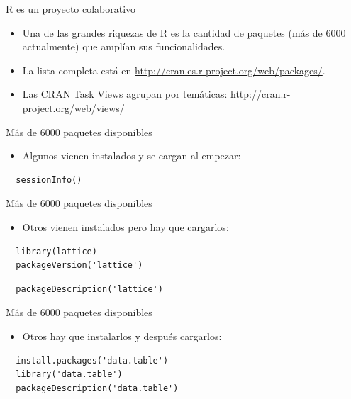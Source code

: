 \documentclass[xcolor={usenames,svgnames,dvipsnames}]{beamer}
\begin{document}
\begin{frame}[label=sec-1-1-6]{R es un proyecto colaborativo}
\begin{itemize}
\item Una de las grandes riquezas de R es la cantidad de paquetes (más
de 6000 actualmente) que amplían sus funcionalidades.
\item La lista completa está en \url{http://cran.es.r-project.org/web/packages/}.
\item Las CRAN Task Views agrupan por temáticas:
\url{http://cran.r-project.org/web/views/}
\end{itemize}
\end{frame}

\begin{frame}[fragile,label=sec-1-1-7]{Más de 6000 paquetes disponibles}
 \begin{itemize}
\item Algunos vienen instalados y se cargan al empezar:
\end{itemize}
\lstset{language=R,label= ,caption= ,numbers=none}
\begin{lstlisting}
  sessionInfo()
\end{lstlisting}
\end{frame}
\begin{frame}[fragile,label=sec-1-1-8]{Más de 6000 paquetes disponibles}
 \begin{itemize}
\item Otros vienen instalados pero hay que cargarlos:
\end{itemize}
\lstset{language=R,label= ,caption= ,numbers=none}
\begin{lstlisting}
  library(lattice)
  packageVersion('lattice')
\end{lstlisting}
\lstset{language=R,label= ,caption= ,numbers=none}
\begin{lstlisting}
  packageDescription('lattice')
\end{lstlisting}
\end{frame}

\begin{frame}[fragile,label=sec-1-1-9]{Más de 6000 paquetes disponibles}
 \begin{itemize}
\item Otros hay que instalarlos y después cargarlos:
\end{itemize}
\lstset{language=R,label= ,caption= ,numbers=none}
\begin{lstlisting}
  install.packages('data.table')
  library('data.table')
  packageDescription('data.table')
\end{lstlisting}
\end{frame}
\end{document}
